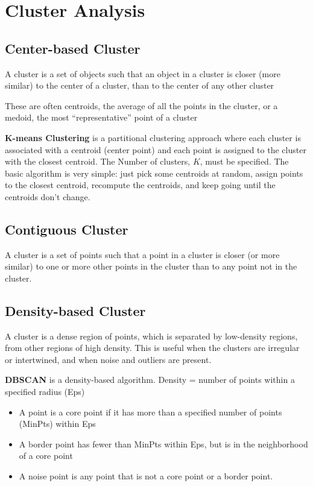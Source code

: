 \documentclass[12pt]{amsart}
\begin{document}
\section{Cluster Analysis}

\subsection{Center-based Cluster}
A cluster is a set of objects such that an object in a cluster is
closer (more similar) to the center of a cluster, than to the
center of any other cluster

These are often centroids, the average of all
the points in the cluster, or a medoid, the most ``representative''
point of a cluster 

\textbf{K-means Clustering} is a partitional clustering approach where each cluster is associated with a centroid (center point) and each point is assigned to the cluster with the closest
centroid.
The Number of clusters, $K$, must be specified. The basic algorithm is very simple: just pick some centroids at random, assign points to the closest centroid, recompute the centroids, and keep going until the centroids don't change.

\subsection{Contiguous Cluster}
A cluster is a set of points such that a point in a cluster is
closer (or more similar) to one or more other points in the
cluster than to any point not in the cluster.

\subsection{Density-based Cluster}
A cluster is a dense region of points, which is separated by
low-density regions, from other regions of high density. This is useful when the clusters are irregular or intertwined, and when
noise and outliers are present. 

\textbf{DBSCAN} is a density-based algorithm.
Density = number of points within a specified radius (Eps)

\begin{itemize}
  \item A point is a core point if it has more than a specified number
of points (MinPts) within Eps

\item A border point has fewer than MinPts within Eps, but is in
the neighborhood of a core point

\item A noise point is any point that is not a core point or a border
point. 
  
  
\end{itemize}
\end{document}
